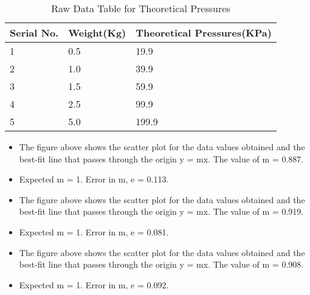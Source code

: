 \documentclass[12pt,a4paper]{article}
\begin{document}
\begin{table}[!ht]
\begin{center}
\begin{tabular}{|p{2cm}|p{2.5cm}|p{5cm}|}
\hline
Serial No. & Weight(Kg) & Theoretical Pressures(KPa)\\
\hline
1 & 0.5 & 19.9\\
2 & 1.0 & 39.9\\
3 & 1.5 & 59.9\\
4 & 2.5 & 99.9\\
5 & 5.0 & 199.9\\
\hline
\end{tabular}
\caption{Raw Data Table for Theoretical Pressures}
\end{center}
\end{table}
\clearpage
\begin{figure}[!ht]
	\begin{center}
	\end{center}
\end{figure}
\begin{itemize}
\item The figure above shows the scatter plot for the data values obtained and the best-fit line that passes through the origin y = mx. The value of m = 0.887.
\item Expected m = 1. Error in m, e = 0.113.
\end{itemize}
\begin{figure}[!ht]
	\begin{center}
	\end{center}
\end{figure}
\begin{itemize}
\item The figure above shows the scatter plot for the data values obtained and the best-fit line that passes through the origin y = mx. The value of m = 0.919.
\item Expected m = 1. Error in m, e = 0.081.
\end{itemize}
\begin{figure}[!ht]
	\begin{center}
	\end{center}
\end{figure}
\begin{itemize}
\item The figure above shows the scatter plot for the data values obtained and the best-fit line that passes through the origin y = mx. The value of m = 0.908.
\item Expected m = 1. Error in m, e = 0.092.
\end{itemize}
\end{document}
